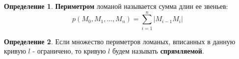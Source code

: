 \documentclass{report}
\theoremstyle{definition}
\newtheorem{definition}{Определение}[section]
\begin{document}
\begin{definition}
  \textbf{Периметром} ломаной называется сумма длин ее звеньев:
  \begin{equation*}
    p(M_0,M_1,\ldots,M_n) = \sum_{i=1}^{n}| M_{i-1}M_i |
  \end{equation*}
  \begin{figure}[h]
    \begin{minipage}[h]{0.49\linewidth}
    \end{minipage}
    \hfill
    \begin{minipage}[h]{0.49\linewidth}
    \end{minipage}
  \end{figure}
\end{definition}

\begin{definition}
  Если множество периметров ломаных, вписанных в данную кривую $l$ - ограничено, то кривую $l$
  будем называть \textbf{спрямляемой}.
\end{definition}
\end{document}
